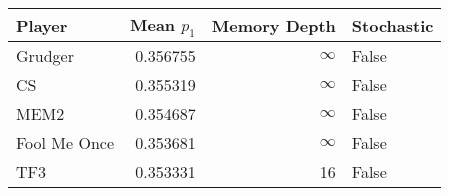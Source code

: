 \begin{tabular}{lrrl}
\toprule
       Player &  Mean $p_1$ &  Memory Depth & Stochastic \\
\midrule
      Grudger &    0.356755 &            \(\infty\) &      False \\
           CS &    0.355319 &            \(\infty\) &      False \\
         MEM2 &    0.354687 &            \(\infty\) &      False \\
 Fool Me Once &    0.353681 &            \(\infty\) &      False \\
          TF3 &    0.353331 &            16 &      False \\
\bottomrule
\end{tabular}
